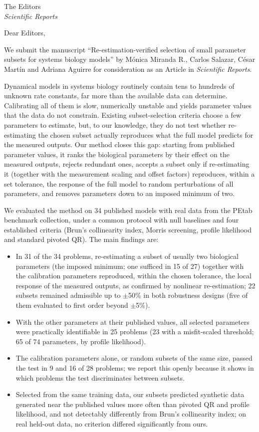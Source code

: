 \documentclass[11pt]{letter}
\begin{document}
\begin{letter}{The Editors\\\emph{Scientific Reports}}

\opening{Dear Editors,}

We submit the manuscript ``Re-estimation-verified selection of small parameter subsets for systems biology models'' by M\'onica Miranda R., Carlos Salazar, C\'esar Mart\'in and Adriana Aguirre for consideration as an Article in \emph{Scientific Reports}.

Dynamical models in systems biology routinely contain tens to hundreds of unknown rate constants, far more than the available data can determine. Calibrating all of them is slow, numerically unstable and yields parameter values that the data do not constrain. Existing subset-selection criteria choose a few parameters to estimate, but, to our knowledge, they do not test whether re-estimating the chosen subset actually reproduces what the full model predicts for the measured outputs. Our method closes this gap: starting from published parameter values, it ranks the biological parameters by their effect on the measured outputs, rejects redundant ones, accepts a subset only if re-estimating it (together with the measurement scaling and offset factors) reproduces, within a set tolerance, the response of the full model to random perturbations of all parameters, and removes parameters down to an imposed minimum of two.

We evaluated the method on 34 published models with real data from the PEtab benchmark collection, under a common protocol with null baselines and four established criteria (Brun's collinearity index, Morris screening, profile likelihood and standard pivoted QR). The main findings are:
\begin{itemize}
\item In 31 of the 34 problems, re-estimating a subset of usually two biological parameters (the imposed minimum; one sufficed in 15 of 27) together with the calibration parameters reproduced, within the chosen tolerance, the local response of the measured outputs, as confirmed by nonlinear re-estimation; 22 subsets remained admissible up to $\pm$50\% in both robustness designs (five of them evaluated to first order beyond $\pm$5\%).
\item With the other parameters at their published values, all selected parameters were practically identifiable in 25 problems (23 with a misfit-scaled threshold; 65 of 74 parameters, by profile likelihood).
\item The calibration parameters alone, or random subsets of the same size, passed the test in 9 and 16 of 28 problems; we report this openly because it shows in which problems the test discriminates between subsets.
\item Selected from the same training data, our subsets predicted synthetic data generated near the published values more often than pivoted QR and profile likelihood, and not detectably differently from Brun's collinearity index; on real held-out data, no criterion differed significantly from ours.
\end{itemize}


\end{letter}
\end{document}
